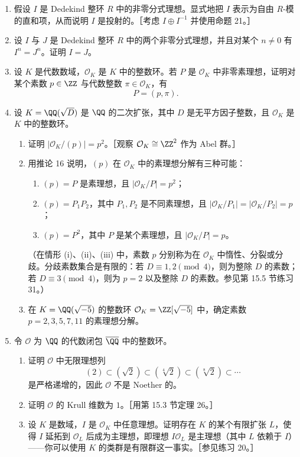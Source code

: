 \begin{enumerate}[label=\arabic*.]
  \item 假设 $I$ 是 Dedekind 整环 $R$ 中的非零分式理想。显式地把 $I$ 表示为自由 $R$-模的直和项，从而说明 $I$ 是投射的。［考虑 $I\oplus I^{-1}$ 并使用命题 21。］
  \item 设 $I$ 与 $J$ 是 Dedekind 整环 $R$ 中的两个非零分式理想，并且对某个 $n\neq0$ 有 $I^n=J^n$。证明 $I=J$。
  \item 设 $K$ 是代数数域，$\mathcal O_K$ 是 $K$ 中的整数环。若 $P$ 是 $\mathcal O_K$ 中非零素理想，证明对某个素数 $p\in\ZZ$ 与代数整数 $\pi\in\mathcal O_K$，有
  \[
    P=(p,\pi).
  \]
  \item 设 $K=\QQ(\sqrt D)$ 是 $\QQ$ 的二次扩张，其中 $D$ 是无平方因子整数，且 $\mathcal O_K$ 是 $K$ 中的整数环。
  \begin{enumerate}[label=(\alph*)]
    \item 证明 $|\mathcal O_K/(p)|=p^2$。［观察 $\mathcal O_K\cong\ZZ^2$ 作为 Abel 群。］
    \item 用推论 16 说明，$(p)$ 在 $\mathcal O_K$ 中的素理想分解有三种可能：
    \begin{enumerate}[label=(\roman*)]
      \item $(p)=P$ 是素理想，且 $|\mathcal O_K/P|=p^2$；
      \item $(p)=P_1P_2$，其中 $P_1,P_2$ 是不同素理想，且 $|\mathcal O_K/P_1|=|\mathcal O_K/P_2|=p$；
      \item $(p)=P^2$，其中 $P$ 是某个素理想，且 $|\mathcal O_K/P|=p$。
    \end{enumerate}
    （在情形 (i)、(ii)、(iii) 中，素数 $p$ 分别称为在 $\mathcal O_K$ 中惰性、分裂或分歧。分歧素数集合是有限的：若 $D\equiv1,2\pmod4$，则为整除 $D$ 的素数；若 $D\equiv3\pmod4$，则为 $p=2$ 以及整除 $D$ 的素数。参见第 15.5 节练习 31。）
    \item 在 $K=\QQ(\sqrt{-5})$ 的整数环 $\mathcal O_K=\ZZ[\sqrt{-5}]$ 中，确定素数 $p=2,3,5,7,11$ 的素理想分解。
  \end{enumerate}
  \item 令 $\mathcal O$ 为 $\QQ$ 的代数闭包 $\overline\QQ$ 中的整数环。
  \begin{enumerate}[label=(\alph*)]
    \item 证明 $\mathcal O$ 中无限理想列
    \[
      (2)\subset (\sqrt2)\subset (\sqrt[4]2)\subset (\sqrt[8]2)\subset\cdots
    \]
    是严格递增的，因此 $\mathcal O$ 不是 Noether 的。
    \item 证明 $\mathcal O$ 的 Krull 维数为 $1$。［用第 15.3 节定理 26。］
    \item 设 $K$ 是数域，$I$ 是 $\mathcal O_K$ 中任意理想。证明存在 $K$ 的某个有限扩张 $L$，使得 $I$ 延拓到 $\mathcal O_L$ 后成为主理想，即理想 $I\mathcal O_L$ 是主理想（其中 $L$ 依赖于 $I$）——你可以使用 $K$ 的类群是有限群这一事实。［参见练习 20。］

\end{enumerate}
\end{enumerate}
